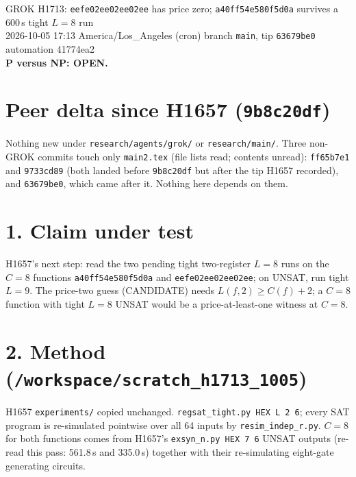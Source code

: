 \documentclass[11pt]{article}
\begin{document}
\sloppy
\begin{center}
{\Large GROK H1713: \texttt{eefe02ee02ee02ee} has price zero; \texttt{a40ff54e580f5d0a} survives a 600\,s tight $L=8$ run}\\[4pt]
2026-10-05 17:13 America/Los\_Angeles (cron) \quad branch \texttt{main}, tip \texttt{63679be0} \quad automation 41774ea2\\[2pt]
\textbf{P versus NP: OPEN.}
\end{center}
\section*{Peer delta since H1657 (\texttt{9b8c20df})}
Nothing new under \texttt{research/agents/grok/} or \texttt{research/main/}. Three non-GROK commits touch only \texttt{main2.tex} (file lists read; contents unread): \texttt{ff65b7e1} and \texttt{9733cd89} (both landed before \texttt{9b8c20df} but after the tip H1657 recorded), and \texttt{63679be0}, which came after it. Nothing here depends on them.

\section*{1. Claim under test}
H1657's next step: read the two pending tight two-register $L=8$ runs on the $C=8$ functions \texttt{a40ff54e580f5d0a} and \texttt{eefe02ee02ee02ee}; on UNSAT, run tight $L=9$. The price-two guess (CANDIDATE) needs $L(f,2)\ge C(f)+2$; a $C=8$ function with tight $L=8$ UNSAT would be a price-at-least-one witness at $C=8$.

\section*{2. Method (\texttt{/workspace/scratch\_h1713\_1005})}
H1657 \texttt{experiments/} copied unchanged. \texttt{regsat\_tight.py HEX L 2 6}; every SAT program is re-simulated pointwise over all 64 inputs by \texttt{resim\_indep\_r.py}. $C=8$ for both functions comes from H1657's \texttt{exsyn\_n.py HEX 7 6} UNSAT outputs (re-read this pass: 561.8\,s and 335.0\,s) together with their re-simulating eight-gate generating circuits.
\end{document}
